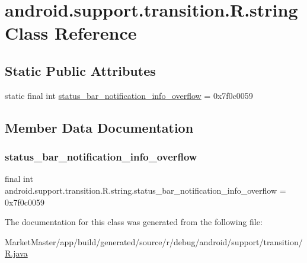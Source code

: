 \hypertarget{classandroid_1_1support_1_1transition_1_1R_1_1string}{}\section{android.\+support.\+transition.\+R.\+string Class Reference}
\label{classandroid_1_1support_1_1transition_1_1R_1_1string}
\subsection*{Static Public Attributes}
\begin{DoxyCompactItemize}
\item 
static final int \mbox{\hyperlink{classandroid_1_1support_1_1transition_1_1R_1_1string_af545e59339bc447d1f12b77542fae31f}{status\+\_\+bar\+\_\+notification\+\_\+info\+\_\+overflow}} = 0x7f0c0059
\end{DoxyCompactItemize}


\subsection{Member Data Documentation}
\mbox{\label{classandroid_1_1support_1_1transition_1_1R_1_1string_af545e59339bc447d1f12b77542fae31f}} 
\subsubsection{\texorpdfstring{status\+\_\+bar\+\_\+notification\+\_\+info\+\_\+overflow}{status\_bar\_notification\_info\_overflow}}
{\footnotesize\ttfamily final int android.\+support.\+transition.\+R.\+string.\+status\+\_\+bar\+\_\+notification\+\_\+info\+\_\+overflow = 0x7f0c0059\hspace{0.3cm}{\ttfamily [static]}}



The documentation for this class was generated from the following file\+:\begin{DoxyCompactItemize}
\item 
Market\+Master/app/build/generated/source/r/debug/android/support/transition/\mbox{\hyperlink{debug_2android_2support_2transition_2R_8java}{R.\+java}}\end{DoxyCompactItemize}
